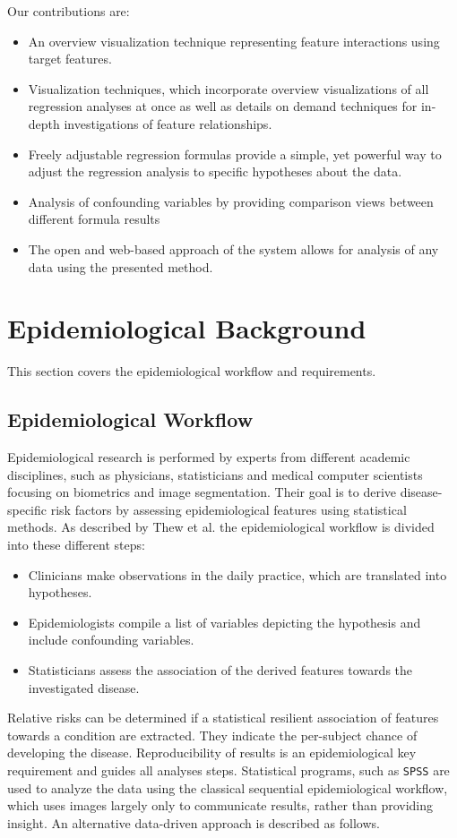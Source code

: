 \documentclass[journal]{style/vgtc} 			          %
\begin{document}
Our contributions are:
\begin{itemize}
	\item An overview visualization technique representing feature interactions using target features.
	\item Visualization techniques, which incorporate overview visualizations of all regression analyses at once as well as details on demand techniques for in-depth investigations of feature relationships.
	\item Freely adjustable regression formulas provide a simple, yet powerful way to adjust the regression analysis to specific hypotheses about the data.
	\item Analysis of confounding variables by providing comparison views between different formula results
	\item The open and web-based approach of the system allows for analysis of any data using the presented method.
\end{itemize}

\section{Epidemiological Background} \label{sec:Background}
This section covers the epidemiological workflow and requirements.
\subsection{Epidemiological Workflow} \label{EpidemiologicalWorkflow}
Epidemiological research is performed by experts from different academic disciplines, such as physicians, statisticians and medical computer scientists focusing on biometrics and image segmentation.
Their goal is to derive disease-specific risk factors by assessing epidemiological features using statistical methods.
As described by Thew et al. \cite{Thew2009} the epidemiological workflow is divided into these different steps:
\begin{itemize}
	\item Clinicians make observations in the daily practice, which are translated into hypotheses.
	\item Epidemiologists compile a list of variables depicting the hypothesis and include confounding variables.
	\item Statisticians assess the association of the derived features towards the investigated disease.
\end{itemize}
Relative risks can be determined if a statistical resilient association of features towards a condition are extracted.
They indicate the per-subject chance of developing the disease.
Reproducibility of results is an epidemiological key requirement and guides all analyses steps.
Statistical programs, such as \texttt{SPSS} are used to analyze the data using the classical sequential epidemiological workflow, which uses images largely only to communicate results, rather than providing insight.
An alternative data-driven approach is described as follows.
\end{document}
